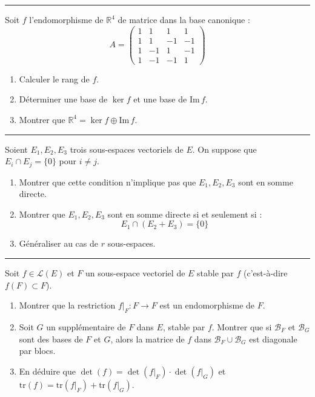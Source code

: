 \documentclass[../PolyS4.tex]{subfiles}
\begin{document}
\vspace{1em}
\hrule
\vspace{1em}


Soit $f$ l'endomorphisme de $\mathbb{R}^4$ de matrice dans la base canonique :
$$A = \begin{pmatrix} 1 & 1 & 1 & 1 \\ 1 & 1 & -1 & -1 \\ 1 & -1 & 1 & -1 \\ 1 & -1 & -1 & 1 \end{pmatrix}$$
\begin{enumerate}
    \item Calculer le rang de $f$.
    \item Déterminer une base de $\ker f$ et une base de $\text{Im}\, f$.
    \item Montrer que $\mathbb{R}^4 = \ker f \oplus \text{Im}\, f$.
\end{enumerate}

\vspace{1em}
\hrule
\vspace{1em}


Soient $E_1, E_2, E_3$ trois sous-espaces vectoriels de $E$. On suppose que $E_i \cap E_j = \{0\}$ pour $i \neq j$.
\begin{enumerate}
    \item Montrer que cette condition n'implique pas que $E_1, E_2, E_3$ sont en somme directe.
    \item Montrer que $E_1, E_2, E_3$ sont en somme directe si et seulement si :
    $$E_1 \cap (E_2 + E_3) = \{0\}$$
    \item Généraliser au cas de $r$ sous-espaces.
\end{enumerate}

\vspace{1em}
\hrule
\vspace{1em}


Soit $f \in \mathcal{L}(E)$ et $F$ un sous-espace vectoriel de $E$ stable par $f$ (c'est-à-dire $f(F) \subset F$).
\begin{enumerate}
    \item Montrer que la restriction $f|_F : F \to F$ est un endomorphisme de $F$.
    \item Soit $G$ un supplémentaire de $F$ dans $E$, stable par $f$. Montrer que si $\mathcal{B}_F$ et $\mathcal{B}_G$ sont des bases de $F$ et $G$, alors la matrice de $f$ dans $\mathcal{B}_F \cup \mathcal{B}_G$ est diagonale par blocs.
    \item En déduire que $\det(f) = \det(f|_F) \cdot \det(f|_G)$ et $\text{tr}(f) = \text{tr}(f|_F) + \text{tr}(f|_G)$.
\end{enumerate}
\end{document}
